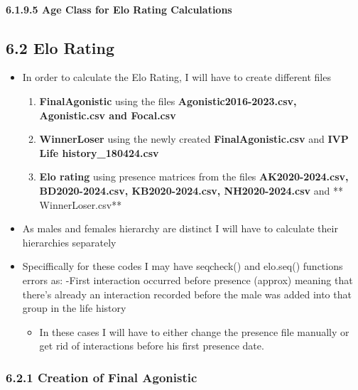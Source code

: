 \documentclass[
]{article}
\providecommand{\tightlist}{%
  \setlength{\itemsep}{0pt}\setlength{\parskip}{0pt}}
\begin{document}
\hypertarget{age-class-for-elo-rating-calculations}{%
\paragraph{6.1.9.5 Age Class for Elo Rating
Calculations}\label{age-class-for-elo-rating-calculations}}

\hypertarget{elo-rating}{%
\subsection{6.2 Elo Rating}\label{elo-rating}}

\begin{itemize}
\item
  In order to calculate the Elo Rating, I will have to create different
  files

  \begin{enumerate}
  \def\labelenumi{\arabic{enumi}.}
  \tightlist
  \item
    \textbf{FinalAgonistic} using the files
    \textbf{Agonistic2016-2023.csv, Agonistic.csv and Focal.csv}
  \item
    \textbf{WinnerLoser} using the newly created
    \textbf{FinalAgonistic.csv} and \textbf{IVP Life
    history\_180424.csv}
  \item
    \textbf{Elo rating} using presence matrices from the files
    \textbf{AK2020-2024.csv, BD2020-2024.csv, KB2020-2024.csv,
    NH2020-2024.csv} and ** WinnerLoser.csv**
  \end{enumerate}
\item
  As males and females hierarchy are distinct I will have to calculate
  their hierarchies separately
\item
  Speciffically for these codes I may have seqcheck() and elo.seq()
  functions errors as: -First interaction occurred before presence
  (approx) meaning that there's already an interaction recorded before
  the male was added into that group in the life history

  \begin{itemize}
  \tightlist
  \item
    In these cases I will have to either change the presence file
    manually or get rid of interactions before his first presence date.
  \end{itemize}
\end{itemize}

\hypertarget{creation-of-final-agonistic}{%
\subsubsection{6.2.1 Creation of Final
Agonistic}\label{creation-of-final-agonistic}}
\end{document}
